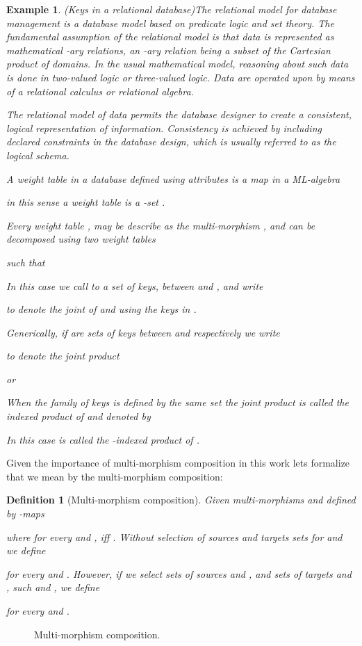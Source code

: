 \documentclass[oribibl]{llncs}
\newtheorem{defn}{Definition}
\newtheorem{exam}{Example}
\begin{document}
\begin{exam}(Keys in a relational database)\label{def:indexproduct}
The relational model for database management is a database model based on predicate logic and set theory. The fundamental assumption of the relational model is that data is represented as mathematical -ary relations, an -ary relation being a subset of the Cartesian product of  domains. In the usual mathematical model, reasoning about such data is done in two-valued logic or three-valued logic. Data are operated upon by means of a relational calculus or relational algebra.

The relational model of data permits the database designer to create a consistent, logical representation of information. Consistency is achieved by including declared constraints in the database design, which is usually referred to as the logical schema.


A weight table  in a database defined using attributes  is a map in a ML-algebra

in this sense a weight table is a -set .

Every weight table , may be describe as the multi-morphism , and can be decomposed using two weight tables


such that

In this case we call to  a set of \emph{keys}, between  and , and write

to denote the joint of  and  using the keys in .

Generically, if  are sets of keys between  and respectively  we write

to denote the joint product

or

When the family  of keys is defined by the same set  the joint product is called the  indexed product of  and denoted by

In this case  is called the -\emph{indexed product} of .
\end{exam}

Given the importance of multi-morphism composition in this work lets formalize that we mean by the multi-morphism composition:
\begin{defn}[Multi-morphism composition]\label{def:composition}
Given multi-morphisms  and  defined by -maps

where  for every  and ,  iff . Without selection of sources and targets sets for  and  we define

for every  and . However, if we select sets of sources  and , and sets of targets  and , such  and , we define

for every  and .
\end{defn}
\begin{figure}[h]

\caption{Multi-morphism composition.}\label{multimorphism composition}
\end{figure}
\end{document}
